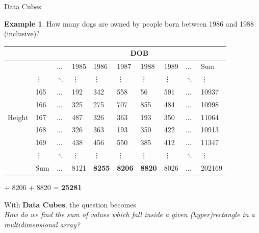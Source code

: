 \documentclass{beamer}
\theoremstyle{definition}
\newtheorem{myexample}{Example}
\theoremstyle{definition}
\begin{document}
\begin{frame}{Data Cubes}
    \begin{myexample}
        How many dogs are owned by people born between 1986 and 1988 (inclusive)?
    \end{myexample}

    \begin{table}[h]\footnotesize
        \begin{tabular} { | l | l | l | l | l | l | l | l | l | l |}
        \hline
        & & \multicolumn{8}{|c|}{DOB} \\ \hline
        & & $\hdots$ & 1985 & 1986 & 1987 & 1988 & 1989 & $\hdots$ & Sum \\ \hline
        \multirow{7}{*}{Height}
        & \vdots & $\ddots$ & \vdots & \vdots & \vdots & \vdots & \vdots & $\ddots$ & \vdots \\
        & 165 & $\hdots$ & 192 & 342 & 558 & 56 & 591 & $\hdots$ & 10937 \\
        & 166 & $\hdots$ & 325 & 275 & 707 & 855 & 484 & $\hdots$ & 10998 \\
        & 167 & $\hdots$ & 487 & 326 & 363 & 193 & 350 & $\hdots$ & 11064 \\
        & 168 & $\hdots$ & 326 & 363 & 193 & 350 & 422 & $\hdots$ & 10913 \\
        & 169 & $\hdots$ & 438 & 456 & 550 & 385 & 412 & $\hdots$ & 11347 \\
        & \vdots & $\ddots$ & \vdots & \vdots & \vdots & \vdots & \vdots & $\ddots$ & \vdots \\
        & Sum & $\hdots$ & 8121 & \textbf{8255} & \textbf{8206} & \textbf{8820} & 8026 & $\hdots$ & 202169 \\
        \hline
        \end{tabular}
    \end{table}
     + 8206 + 8820 = \textbf{25281}
\end{frame}

\begin{frame}
    With \textbf{Data Cubes}, the question becomes \\
    \textit{How do we find the sum of values which fall inside a given (hyper)rectangle in a multidimensional array?}
\end{frame}
\end{document}
